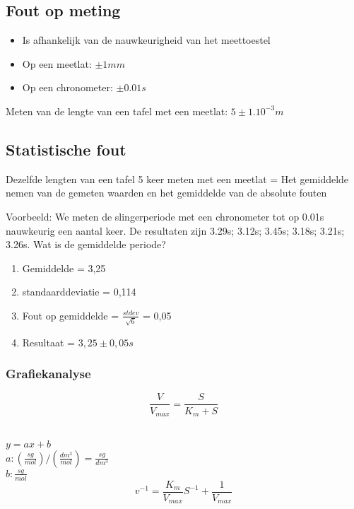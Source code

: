 \documentclass[12pt]{report}
\begin{document}
\subsection{Fout op meting}
\begin{itemize}
 \item Is afhankelijk van de nauwkeurigheid van het meettoestel
 \item Op een meetlat: $\pm 1mm$
 \item Op een chronometer: $\pm 0.01s$
\end{itemize}
Meten van de lengte van een tafel met een meetlat: $5 \pm 1.10^{-3} m$ 

\subsection{Statistische fout}

Dezelfde lengten van een tafel 5 keer meten met een meetlat = 
Het gemiddelde nemen van de gemeten waarden en het gemiddelde van de absolute
fouten

Voorbeeld: We meten de slingerperiode met een chronometer tot op 0.01s nauwkeurig een 
aantal keer. De resultaten zijn 3.29s; 3.12s; 3.45s; 3.18s; 3.21s; 3.26s.
Wat is de gemiddelde periode?
\begin{enumerate}
 \item Gemiddelde = 3,25
 \item standaarddeviatie = 0,114
 \item Fout op gemiddelde = $\frac{stdev}{\sqrt{6}}$ = 0,05
 \item Resultaat = $3,25 \pm 0,05 s$
\end{enumerate}


\subsubsection{Grafiekanalyse}
$$ \frac{V}{V_{max}} = \frac{S}{K_m + S} $$
\\
$ y = ax + b $
\\
$a: (\frac{sg}{mol})/(\frac{dm^{3}}{mol}) = \frac{sg}{dm^3}$
\\
$b: \frac{sg}{mol} $
\\
$$v^{-1} = \frac{K_m}{V_{max}}S^{-1} + \frac{1}{V_{max}}$$
\end{document}
